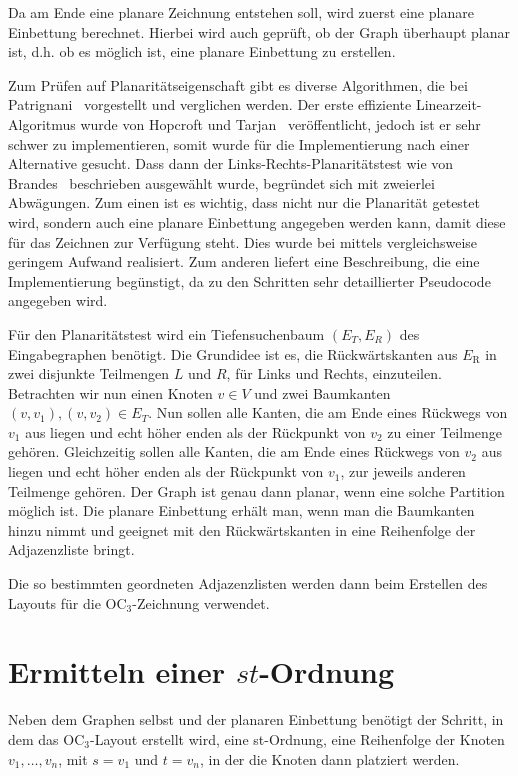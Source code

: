 \documentclass[a4paper]{scrreprt}
\theoremstyle{definition}
\begin{document}
Da am Ende eine planare Zeichnung entstehen soll, wird zuerst eine planare Einbettung berechnet. Hierbei wird auch geprüft, ob der Graph überhaupt planar ist, d.h. ob es möglich ist, eine planare Einbettung zu erstellen. 

Zum Prüfen auf Planaritätseigenschaft gibt es diverse Algorithmen, die bei Patrignani~\cite{patrignani-07} vorgestellt und verglichen werden. Der erste effiziente Linearzeit-Algoritmus wurde von Hopcroft und Tarjan~\cite{hopcroft+tarjan-74} veröffentlicht, jedoch ist er sehr schwer zu implementieren, somit wurde für die Implementierung nach einer Alternative gesucht. Dass dann der Links-Rechts-Planaritätstest wie von Brandes~\cite{brandes-09} beschrieben ausgewählt wurde, begründet sich mit zweierlei Abwägungen. Zum einen ist es wichtig, dass nicht nur die Planarität getestet wird, sondern auch eine planare Einbettung angegeben werden kann, damit diese für das Zeichnen zur Verfügung steht. Dies wurde bei \cite{brandes-09} mittels vergleichsweise geringem Aufwand realisiert. Zum anderen liefert \cite{brandes-09} eine Beschreibung, die eine Implementierung begünstigt, da zu den Schritten sehr detaillierter Pseudocode angegeben wird. %

Für den Planaritätstest wird ein Tiefensuchenbaum $(E_T, E_R)$ des Eingabegraphen benötigt. Die Grundidee ist es, die Rückwärtskanten aus $E_\text{R}$ in zwei disjunkte Teilmengen $L$ und $R$, für Links und Rechts, einzuteilen. Betrachten wir nun einen Knoten $v \in V$ und zwei Baumkanten $(v, v_1), (v, v_2) \in E_T$. Nun sollen alle Kanten, die am Ende eines Rückwegs von $v_1$ aus liegen und echt höher enden als der Rückpunkt von $v_2$ zu einer Teilmenge gehören. Gleichzeitig sollen alle Kanten, die am Ende eines Rückwegs von $v_2$ aus liegen und echt höher enden als der Rückpunkt von $v_1$, zur jeweils anderen Teilmenge gehören. Der Graph ist genau dann planar, wenn eine solche Partition möglich ist. Die planare Einbettung erhält man, wenn man die Baumkanten hinzu nimmt und geeignet mit den Rückwärtskanten in eine Reihenfolge der Adjazenzliste bringt.

Die so bestimmten geordneten Adjazenzlisten werden dann beim Erstellen des Layouts für die OC$_3$-Zeichnung verwendet.

\section{Ermitteln einer $st$-Ordnung}

Neben dem Graphen selbst und der planaren Einbettung benötigt der Schritt, in dem das OC$_3$-Layout erstellt wird, eine st-Ordnung, eine Reihenfolge der Knoten $v_1, \dots, v_n$, mit $s=v_1$ und $t=v_n$, in der die Knoten dann platziert werden. 
\end{document}
